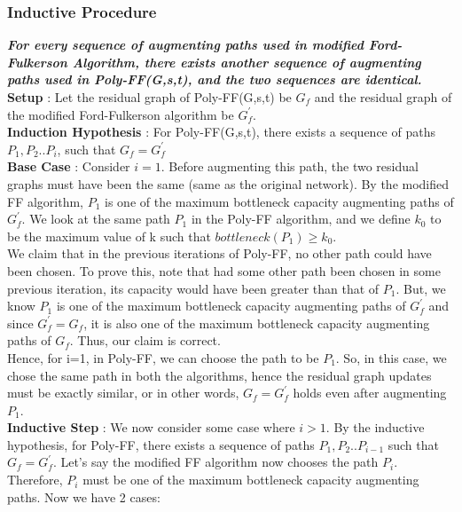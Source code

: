 \documentclass{article}
\begin{document}
\begin{mdframed}
\subsubsection{Inductive Procedure}
\textbf{\textit{For every sequence of augmenting paths used in modified Ford-Fulkerson Algorithm, there exists another sequence of augmenting paths used in Poly-FF(G,s,t), and the two sequences are identical.}}\vspace{0.2cm}\\
\textbf{Setup} : Let the residual graph of Poly-FF(G,s,t) be $G_{f}$ and the residual graph of the modified Ford-Fulkerson algorithm be $G_{f}^{'}$.\vspace{0.2cm}\\ 
\textbf{Induction Hypothesis} : For Poly-FF(G,s,t), there exists a sequence of paths $P_{1},P_{2}..P_{i}$, such that $G_{f}=G_{f}^{'}$\vspace{0.2cm}\\
\textbf{Base Case} : Consider $i=1$. Before augmenting this path, the two residual graphs must have been the same (same as the original network). 
By the modified FF algorithm, $P_{1}$ is one of the maximum bottleneck capacity augmenting paths of $G_{f}^{'}$. We look at the same path $P_{1}$ in the Poly-FF algorithm, and we define $k_{0}$ to be the maximum value of k such that $bottleneck(P_{1}) \geq k_{0}$. \\
We claim that in the previous iterations of Poly-FF, no other path could have been chosen. To prove this, note that had some other path been chosen in some previous iteration, its capacity would have been greater than that of $P_{1}$. But, we know $P_{1}$ is one of the maximum bottleneck capacity augmenting paths of $G_{f}^{'}$ and since $G_{f}^{'}=G_{f}$, it is also one of the maximum bottleneck capacity augmenting paths of $G_{f}$. Thus, our claim is correct.\\
Hence, for i=1, in Poly-FF, we can choose the path to be $P_{1}$. So, in this case, we chose the same path in both the algorithms, hence the residual graph updates must be exactly similar, or in other words, $G_{f}=G_{f}^{'}$ holds even after augmenting $P_{1}$.\vspace{0.2cm}\\
\textbf{Inductive Step} : We now consider some case where $i > 1$. By the inductive hypothesis, for Poly-FF, there exists a sequence of paths $P_{1},P_{2}..P_{i-1}$ such that $G_{f}=G_{f}^{'}$. Let's say the modified FF algorithm now chooses the path $P_{i}$. Therefore, $P_{i}$ must be one of the maximum bottleneck capacity augmenting paths. Now we have 2 cases:

\end{mdframed}
\end{document}
